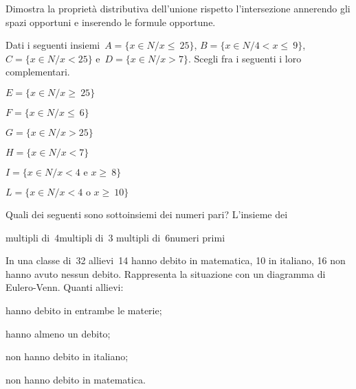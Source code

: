 \begin{esercizio}
\label{ese:7.80}
Dimostra la proprietà distributiva dell'unione rispetto l'intersezione 
annerendo 
gli spazi opportuni
e inserendo le formule opportune.
\begin{center}
 
\end{center}
\vspace{-12pt}
\end{esercizio}

\begin{esercizio}
\label{ese:7.81}
Dati i seguenti insiemi~\(A=\{x\in N/x\le~25\}\), \(B=\{x\in N/4<x\le~9\}\), 
\(C=\{x\in N/x<25\}\) e~\(D=\{x\in N/x>7\}\). 
Scegli fra i seguenti i loro complementari.
\vspace{-6pt}
\begin{multicols}{2}
\begin{enumeratea}
\item \(E=\{x\in N/x\ge~25\}\)
\item \(F=\{x\in N/x\le~6\}\)
\item \(G=\{x\in N/x>25\}\)
\item \(H=\{x\in N/x<7\}\)
\item \(I=\{x\in N/x<4\text{ e }x\ge~8\}\)
\item \(L=\{x\in N/x<4\text{ o }x\ge~10\}\)
\end{enumeratea}
\end{multicols}
\vspace{-12pt}
\end{esercizio}

\begin{esercizio}
\label{ese:7.82}
Quali dei seguenti sono sottoinsiemi dei numeri pari? L'insieme dei
\vspace{-6pt}
\begin{center}
 \boxA\quad multipli di~4\quad\boxB\quad multipli di~3\quad\boxC\quad 
multipli 
di~6\quad\boxD\quad numeri primi
\end{center}
\vspace{-6pt}
\end{esercizio}

\begin{esercizio}
\label{ese:7.83}
In una classe di~32 allievi~14 hanno debito in matematica, 10 in
italiano, 16 non hanno avuto nessun debito. Rappresenta la situazione
con un diagramma di Eulero-Venn. Quanti allievi:
\vspace{-6pt}
\begin{multicols}{2}
\begin{enumeratea}
\item hanno debito in entrambe le materie;
\item hanno almeno un debito;
\item non hanno debito in italiano;
\item non hanno debito in matematica.
\end{enumeratea}
\end{multicols}
\vspace{-12pt}
\end{esercizio}

